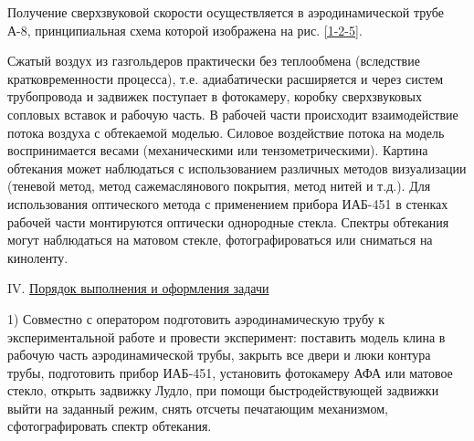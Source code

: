 \documentclass[specialist, subf, href, colorlinks=true, 14pt, final]{disser}
\theoremstyle{definition}
\begin{document}
Получение сверхзвуковой скорости осуществляется в аэродинамической трубе А-8, принципиальная схема которой изображена на рис. \ref{1-2-5}.

Сжатый воздух из газгольдеров практически без теплообмена
(вследствие кратковременности процесса), т.е. адиабатически 
расширяется и через систем трубопровода и задвижек поступает в 
фотокамеру, коробку сверхзвуковых сопловых вставок и рабочую часть.
В рабочей части происходит взаимодействие потока воздуха с 
обтекаемой моделью. Силовое воздействие потока на модель 
воспринимается весами (механическими или тензометрическими). Картина 
обтекания может наблюдаться с использованием различных методов 
визуализации (теневой метод, метод сажемаслянового покрытия, метод
нитей и т.д.). Для использования оптического метода с применением прибора ИАБ-451 в стенках рабочей части монтируются оптически однородные стекла. Спектры обтекания могут наблюдаться на матовом
стекле, фотографироваться или сниматься на киноленту.

\noindent IV. \underline{Порядок выполнения и оформления задачи}

1) Совместно с оператором подготовить аэродинамическую трубу к экспериментальной работе и провести эксперимент: поставить модель клина в рабочую часть аэродинамической трубы, закрыть все двери и люки контура трубы, подготовить прибор ИАБ-451, установить фотокамеру АФА или матовое стекло, открыть задвижку Лудло, при помощи быстродействующей задвижки выйти на заданный режим, снять отсчеты печатающим механизмом, сфотографировать спектр обтекания.
\end{document}

